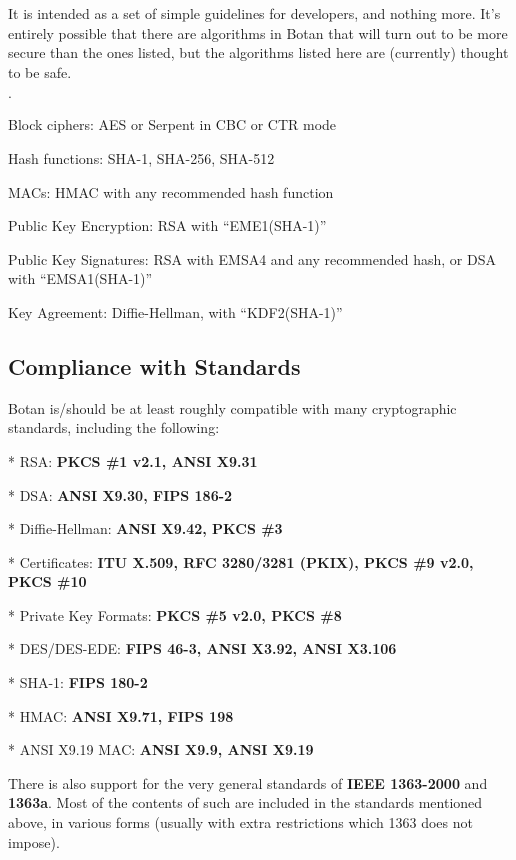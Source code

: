 \documentclass{article}
\begin{document}
It is intended as a set of simple guidelines for developers, and nothing more.
It's entirely possible that there are algorithms in Botan that will turn out to
be more secure than the ones listed, but the algorithms listed here are
(currently) thought to be safe.

\begin{list}{$\cdot$}
  \item Block ciphers: AES or Serpent in CBC or CTR mode

  \item Hash functions: SHA-1, SHA-256, SHA-512

  \item MACs: HMAC with any recommended hash function

  \item Public Key Encryption: RSA with ``EME1(SHA-1)''

  \item Public Key Signatures: RSA with EMSA4 and any recommended hash, or DSA
     with ``EMSA1(SHA-1)''

  \item Key Agreement: Diffie-Hellman, with ``KDF2(SHA-1)''
\end{list}

\subsection{Compliance with Standards}

Botan is/should be at least roughly compatible with many cryptographic
standards, including the following:

\newcommand{\standard}[2]{
   \vskip 4pt
   * #1: \textbf{#2}
}

\standard{RSA}{PKCS \#1 v2.1, ANSI X9.31}

\standard{DSA}{ANSI X9.30, FIPS 186-2}

\standard{Diffie-Hellman}{ANSI X9.42, PKCS \#3}

\standard{Certificates}{ITU X.509, RFC 3280/3281 (PKIX), PKCS \#9 v2.0,
PKCS \#10}

\standard{Private Key Formats}{PKCS \#5 v2.0, PKCS \#8}

\standard{DES/DES-EDE}{FIPS 46-3, ANSI X3.92, ANSI X3.106}

\standard{SHA-1}{FIPS 180-2}

\standard{HMAC}{ANSI X9.71, FIPS 198}

\standard{ANSI X9.19 MAC}{ANSI X9.9, ANSI X9.19}

\vskip 8pt
\noindent
There is also support for the very general standards of \textbf{IEEE 1363-2000}
and \textbf{1363a}. Most of the contents of such are included in the standards
mentioned above, in various forms (usually with extra restrictions which 1363
does not impose).
\end{document}

